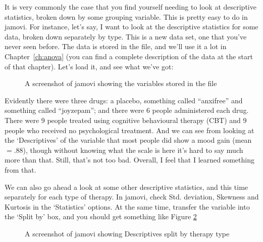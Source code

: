 It is very commonly the case that you find yourself needing to look at descriptive statistics, broken down by some grouping variable. This is pretty easy to do in jamovi. For instance, let's  say, I want to look at the descriptive statistics for some  data, broken down separately by  type. This is a new data set, one that you've never seen before. The data is stored in the  file, and we'll use it a lot in Chapter~\ref{ch:anova} (you can find a complete description of the data at the start of that chapter). Let's load it, and see what we've got:

\vspace{1cm}
\begin{figure}[h]
\begin{center}
\caption{A screenshot of jamovi showing the variables stored in the  file}
\label{fig:clinicaltrial}
\HR
\end{center}
\end{figure}

Evidently there were three drugs: a placebo, something called ``anxifree'' and something called ``joyzepam''; and there were 6 people administered each drug. There were 9 people treated using cognitive behavioural therapy (CBT) and 9 people who received no psychological treatment. And we can see from looking at the `Descriptives' of the  variable that most people did show a mood gain (mean $=.88$), though without knowing what the scale is here it's hard to say much more than that. Still, that's not too bad. Overall, I feel that I learned something from that.

We can also go ahead a look at some other descriptive statistics, and this time separately for each type of therapy. In jamovi, check Std. deviation, Skewness and Kurtosis in the `Statistics' options. At the same time, transfer the  variable into the `Split by' box, and you should get something like Figure \ref{fig:clinicaltrial_grouping}

\vspace{1cm}
\begin{figure}[h]
\begin{center}
\caption{A screenshot of jamovi showing Descriptives split by therapy type}
\label{fig:clinicaltrial_grouping}
\HR
\end{center}
\end{figure}

